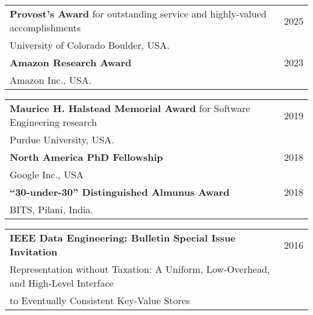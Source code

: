 \documentclass{article}
\begin{document}
\begin{center}
  \begin{tabular}{ p{15cm}  r }
{\bf Provost's Award} for outstanding service and highly-valued accomplishments& 2025 \\ [3pt]
\hspace{2em} University of Colorado Boulder, USA. &
\\[6pt]
%
{\bf Amazon Research Award} & 2023 \\ [3pt]
\hspace{2em} Amazon Inc., USA. &
\\[6pt]
%
  \end{tabular}

  \begin{tabular}{ p{15cm}  r }
{\bf Maurice H. Halstead Memorial Award} for Software
Engineering research & 2019 \\ [3pt]
\hspace{2em} Purdue University, USA. &
\\[6pt]
%
{\bf North America PhD Fellowship}& 2018 \\ [3pt]
\hspace{2em} Google Inc., USA &
\\[6pt]
%
{\bf ``30-under-30'' Distinguished Almunus Award} & 2018\\ [3pt]
    \hspace{2em} BITS, Pilani, India. & \\[6pt]
   \end{tabular}
\end{center}

\begin{center}
  \begin{tabular}{ p{15cm}  r }
    {\bf IEEE Data Engineering: Bulletin Special Issue Invitation} & 2016\\ [3pt]
    \hspace{2em} Representation without Taxation: A Uniform, Low-Overhead,
    and High-Level Interface & \\
    \hspace{2em} to Eventually Consistent Key-Value Stores   & \\[6pt]
    \end{tabular}
\end{center}


\end{document}
